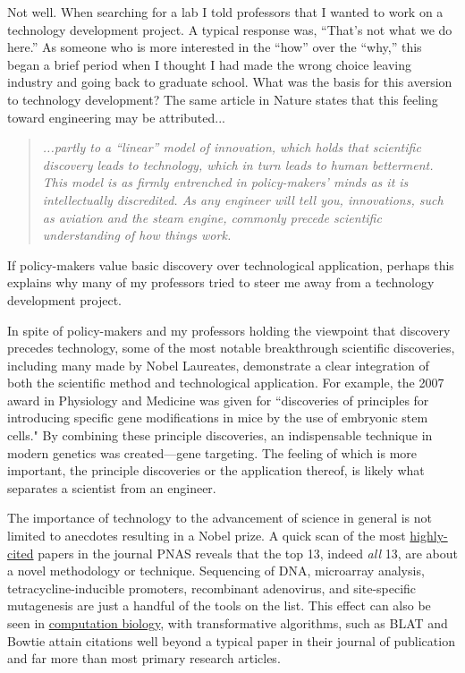     Not well. When searching for a lab I told professors that I wanted to work on a technology development project. A typical response was, ``That's not what we do here.'' As someone who is more interested in the ``how'' over the ``why,'' this began a brief period when I thought I had made the wrong choice leaving industry and going back to graduate school. What was the basis for this aversion to technology development? The same article in Nature states that this feeling toward engineering may be attributed...

    \begin{quote} 
      \itshape 
      \singlespacing
      ...partly to a ``linear'' model of innovation, which holds that scientific discovery leads to technology, which in turn leads to human betterment. This model is as firmly entrenched in policy-makers' minds as it is intellectually discredited. As any engineer will tell you, innovations, such as aviation and the steam engine, commonly precede scientific understanding of how things work.
      \end{quote} 

    If policy-makers value basic discovery over technological application, perhaps this explains why many of my professors tried to steer me away from a technology development project.

    In spite of policy-makers and my professors holding the viewpoint that discovery precedes technology, some of the most notable breakthrough scientific discoveries, including many made by Nobel Laureates, demonstrate a clear integration of both the scientific method and technological application. For example, the 2007 award in Physiology and Medicine was given for ``discoveries of principles for introducing specific gene modifications in mice by the use of embryonic stem cells."  By combining these principle discoveries, an indispensable technique in modern genetics was created---gene targeting. The feeling of which is more important, the principle discoveries or the application thereof, is likely what separates a scientist from an engineer.

    The importance of technology to the advancement of science in general is not limited to anecdotes resulting in a Nobel prize. A quick scan of the most \href{http://www.pnas.org/reports/most-cited}{highly-cited} papers in the journal PNAS reveals that the top 13, indeed \textit{all} 13, are about a novel methodology or technique. Sequencing of DNA, microarray analysis, tetracycline-inducible promoters, recombinant adenovirus, and site-specific mutagenesis are just a handful of the tools on the list. This effect can also be seen in \href{http://simplystatistics.org/2014/04/07/writing-good-software-can-have-more-impact-than-publishing-in-high-impact-journals-for-genomic-statisticians/}{computation biology}, with transformative algorithms, such as BLAT \citep{Altschul1990} and Bowtie \citep{Langmead2009} attain citations well beyond a typical paper in their journal of publication and far more than most primary research articles.    

